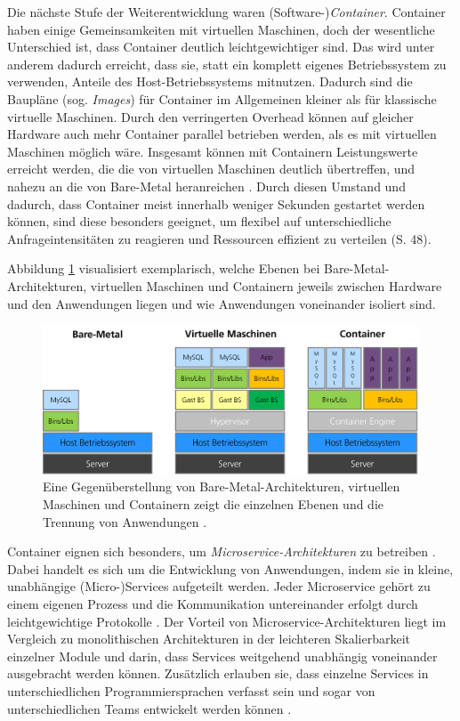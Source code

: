 \documentclass[11pt,a4paper]{article}
\begin{document}
Die nächste Stufe der Weiterentwicklung waren (Software-)\emph{Container}.
Container haben einige Gemeinsamkeiten mit virtuellen Maschinen, doch der wesentliche Unterschied ist,
dass Container deutlich leichtgewichtiger sind. Das wird unter anderem dadurch erreicht, dass sie,
statt ein komplett eigenes Betriebssystem zu verwenden,
Anteile des Host-Betriebssystems mitnutzen. Dadurch sind die Baupläne (sog. \emph{Images})
für Container im Allgemeinen kleiner als für klassische virtuelle Maschinen.
Durch den verringerten Overhead können auf gleicher Hardware auch mehr Container parallel betrieben werden,
als es mit virtuellen Maschinen möglich wäre.
Insgesamt können mit Containern Leistungswerte erreicht werden, die die von virtuellen Maschinen deutlich übertreffen,
und nahezu an die von Bare-Metal heranreichen \cite{1272998.1273025}.
Durch diesen Umstand und dadurch, dass Container meist innerhalb weniger Sekunden gestartet werden können, sind diese besonders geeignet,
um flexibel auf unterschiedliche Anfrageintensitäten zu reagieren und Ressourcen effizient zu verteilen \cite{kofler2021docker} (S. 48).

Abbildung \ref{fig:arch-vergleich} visualisiert exemplarisch, welche Ebenen bei Bare-Metal-Architekturen, virtuellen Maschinen und Containern
jeweils zwischen Hardware und den Anwendungen liegen und wie Anwendungen voneinander isoliert sind.

\begin{figure}[h]
  \centering
  \includegraphics[width=1\textwidth]{./media/7899247 (eigen).png}
  \caption{Eine Gegenüberstellung von Bare-Metal-Architekturen, virtuellen Maschinen und Containern zeigt die einzelnen Ebenen und die Trennung von Anwendungen \cite{7899247}.}
  \label{fig:arch-vergleich}
\end{figure}

Container eignen sich besonders, um \emph{Microservice-Architekturen} zu betreiben \cite{7158965}. Dabei handelt es sich um die
Entwicklung von Anwendungen, indem sie in kleine, unabhängige (Micro-)Services aufgeteilt werden. Jeder Microservice gehört zu
einem eigenen Prozess und die Kommunikation untereinander erfolgt durch leichtgewichtige Protokolle \cite{8406008}.
Der Vorteil von Microservice-Architekturen liegt im Vergleich zu monolithischen Architekturen in der
leichteren Skalierbarkeit einzelner Module und darin, dass Services weitgehend unabhängig voneinander
ausgebracht werden können. Zusätzlich erlauben sie, dass einzelne Services in unterschiedlichen Programmiersprachen
verfasst sein und sogar von unterschiedlichen Teams entwickelt werden können \cite{microservices}.
\end{document}
